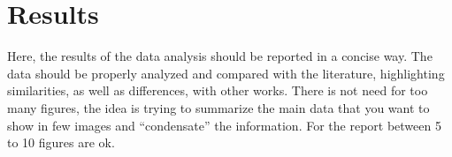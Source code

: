 \chapter{Results}

Here, the results of the data analysis should be reported in a concise way. The data should be
properly analyzed and compared with the literature, highlighting similarities, as well as
differences, with other works. There is not need for too many figures, the idea is trying to
summarize the main data that you want to show in few images and “condensate” the
information. For the report between 5 to 10 figures are ok. 